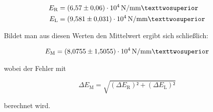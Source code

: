 \begin{align*}
E_\text{R} &= \SI{6.57+-0.06e4}{\newton\per\milli\meter²}\\
E_\text{L} &= \SI{9.581+-0.031e4}{\newton\per\milli\meter²}
\end{align*}

Bildet man aus diesen Werten den Mittelwert ergibt sich schließlich: 

\begin{equation*}
E_\text{M} = \SI{8.0755+-1.5055e4}{\newton\per\milli\meter²}
\end{equation*}

wobei der Fehler mit 

\begin{equation*}
\Delta E_\text{M} = \sqrt{(\Delta E_\text{R})²+(\Delta E_\text{L})²}
\end{equation*}

berechnet wird.